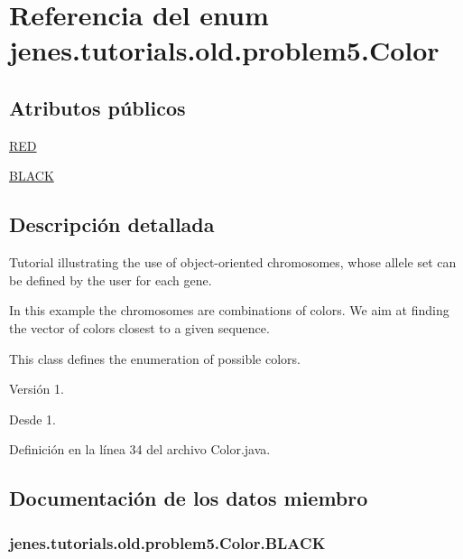\hypertarget{enumjenes_1_1tutorials_1_1old_1_1problem5_1_1_color}{\section{Referencia del enum jenes.\-tutorials.\-old.\-problem5.\-Color}
\label{enumjenes_1_1tutorials_1_1old_1_1problem5_1_1_color}
}
\subsection*{Atributos públicos}
\begin{DoxyCompactItemize}
\item 
\hyperlink{enumjenes_1_1tutorials_1_1old_1_1problem5_1_1_color_ad51840590e9a87bd4367c25e5022866b}{R\-E\-D}
\item 
\hyperlink{enumjenes_1_1tutorials_1_1old_1_1problem5_1_1_color_a8c48229adc1957d055626d3ce74bc22f}{B\-L\-A\-C\-K}
\end{DoxyCompactItemize}


\subsection{Descripción detallada}
Tutorial illustrating the use of object-\/oriented chromosomes, whose allele set can be defined by the user for each gene.

In this example the chromosomes are combinations of colors. We aim at finding the vector of colors closest to a given sequence.

This class defines the enumeration of possible colors.

\begin{DoxyVersion}{Versión}
1. 
\end{DoxyVersion}
\begin{DoxySince}{Desde}
1. 
\end{DoxySince}


Definición en la línea 34 del archivo Color.\-java.



\subsection{Documentación de los datos miembro}
\hypertarget{enumjenes_1_1tutorials_1_1old_1_1problem5_1_1_color_a8c48229adc1957d055626d3ce74bc22f}{
\subsubsection[{B\-L\-A\-C\-K}]{\setlength{\rightskip}{0pt plus 5cm}jenes.\-tutorials.\-old.\-problem5.\-Color.\-B\-L\-A\-C\-K}}\label{enumjenes_1_1tutorials_1_1old_1_1problem5_1_1_color_a8c48229adc1957d055626d3ce74bc22f}


